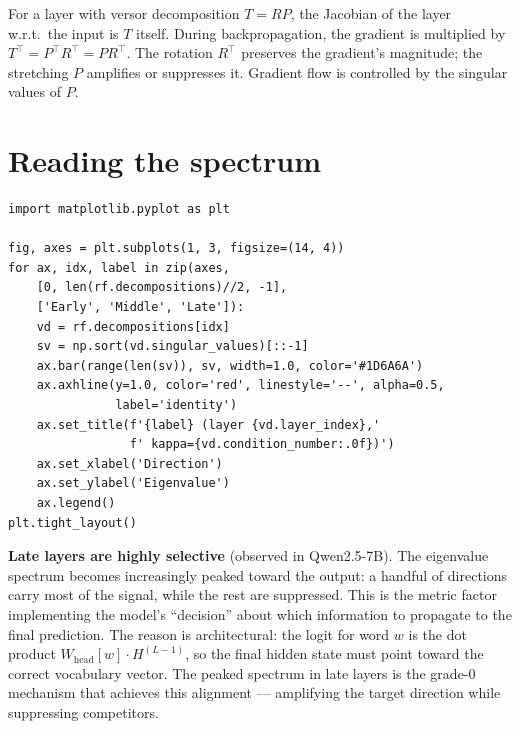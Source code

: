 \documentclass[11pt, twoside, openright]{memoir}
\begin{document}
\begin{mathbox}
For a layer with versor decomposition $T = RP$, the Jacobian of the
layer w.r.t.\ the input is $T$ itself.  During backpropagation, the
gradient is multiplied by $T^\top = P^\top R^\top = PR^\top$.  The
rotation $R^\top$ preserves the gradient's magnitude; the stretching
$P$ amplifies or suppresses it.  Gradient flow is controlled by the
singular values of $P$.
\end{mathbox}

\section{Reading the spectrum}

\begin{lstlisting}[caption={Eigenvalue spectra of three layers}]
import matplotlib.pyplot as plt

fig, axes = plt.subplots(1, 3, figsize=(14, 4))
for ax, idx, label in zip(axes,
    [0, len(rf.decompositions)//2, -1],
    ['Early', 'Middle', 'Late']):
    vd = rf.decompositions[idx]
    sv = np.sort(vd.singular_values)[::-1]
    ax.bar(range(len(sv)), sv, width=1.0, color='#1D6A6A')
    ax.axhline(y=1.0, color='red', linestyle='--', alpha=0.5,
               label='identity')
    ax.set_title(f'{label} (layer {vd.layer_index},'
                 f' kappa={vd.condition_number:.0f})')
    ax.set_xlabel('Direction')
    ax.set_ylabel('Eigenvalue')
    ax.legend()
plt.tight_layout()
\end{lstlisting}

\begin{finding}
\textbf{Late layers are highly selective} (observed in Qwen2.5-7B).
The eigenvalue spectrum becomes increasingly peaked toward the output: a
handful of directions carry most of the signal, while the rest are
suppressed.  This is the metric factor implementing the model's ``decision'' about
which information to propagate to the final prediction.  The reason is
architectural: the logit for word $w$ is the dot product
$W_{\mathrm{head}}[w] \cdot H^{(L-1)}$, so the final hidden state
must point toward the correct vocabulary vector.  The peaked spectrum
in late layers is the grade-0 mechanism that achieves this alignment
--- amplifying the target direction while suppressing competitors.
\end{finding}
\end{document}
